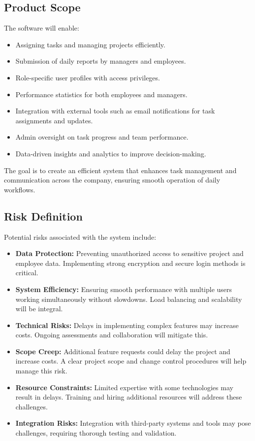 \documentclass[a4paper,12pt]{article}
\begin{document}
\subsection{Product Scope}
The software will enable:
\begin{itemize}
    \item Assigning tasks and managing projects efficiently.
    \item Submission of daily reports by managers and employees.
    \item Role-specific user profiles with access privileges.
    \item Performance statistics for both employees and managers.
    \item Integration with external tools such as email notifications for task assignments and updates.
    \item Admin oversight on task progress and team performance.
    \item Data-driven insights and analytics to improve decision-making.
\end{itemize}
The goal is to create an efficient system that enhances task management and communication across the company, ensuring smooth operation of daily workflows.

\subsection{Risk Definition}
Potential risks associated with the system include:
\begin{itemize}
    \item \textbf{Data Protection:} Preventing unauthorized access to sensitive project and employee data. Implementing strong encryption and secure login methods is critical.
    \item \textbf{System Efficiency:} Ensuring smooth performance with multiple users working simultaneously without slowdowns. Load balancing and scalability will be integral.
    \item \textbf{Technical Risks:} Delays in implementing complex features may increase costs. Ongoing assessments and collaboration will mitigate this.
    \item \textbf{Scope Creep:} Additional feature requests could delay the project and increase costs. A clear project scope and change control procedures will help manage this risk.
    \item \textbf{Resource Constraints:} Limited expertise with some technologies may result in delays. Training and hiring additional resources will address these challenges.
    \item \textbf{Integration Risks:} Integration with third-party systems and tools may pose challenges, requiring thorough testing and validation.
\end{itemize}
\end{document}
